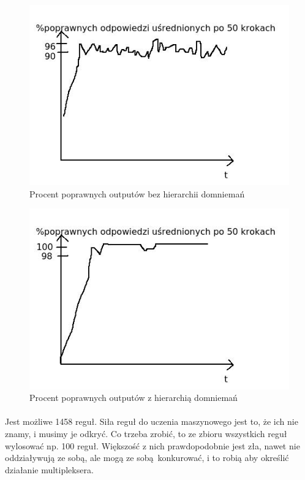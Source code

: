 \documentclass{article}
\begin{document}
		\begin{figure}[ht]
			\label{fig:fig2}
			\centering
			\includegraphics[scale=0.5]{bezhierarchii.jpeg}
			\caption{Procent poprawnych outputów bez hierarchii domniemań}
		\end{figure}
		
		\begin{figure}[ht]
			\label{fig:fig2}
			\centering
			\includegraphics[scale=0.5]{zhierarchia.jpeg}
			\caption{Procent poprawnych outputów z hierarchią domniemań}
		\end{figure}
		
		\paragraph{} Jest możliwe 1458 reguł.
		Siła reguł do uczenia maszynowego jest to, że ich nie znamy, i musimy je odkryć. Co trzeba zrobić, to ze zbioru wszystkich reguł wylosować np. 100 reguł. Większość z nich prawdopodobnie jest zła, nawet nie oddziaływują ze sobą, ale mogą ze sobą konkurować, i to robią aby określić działanie multipleksera.
		
\end{document}
